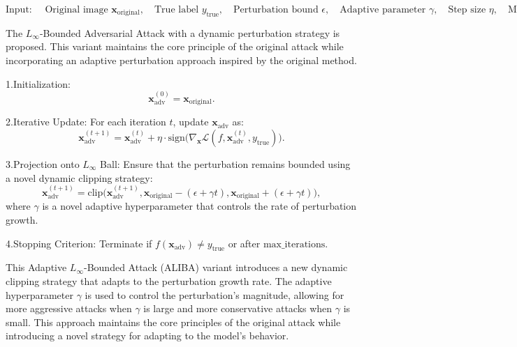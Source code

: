 \[
\text{Input: } \quad \text{Original image } \mathbf{x}_{\text{original}}, \quad \text{True label } y_{\text{true}}, \quad \text{Perturbation bound } \epsilon, \quad \text{Adaptive parameter } \gamma, \quad \text{Step size } \eta, \quad \text{Maximum iterations}.
\]

The $L_\infty$-Bounded Adversarial Attack with a dynamic perturbation strategy is proposed. This variant maintains the core principle of the original attack while incorporating an adaptive perturbation approach inspired by the original method.

1.Initialization:
   \[
   \mathbf{x}_{\text{adv}}^{(0)} = \mathbf{x}_{\text{original}}.
   \]

2.Iterative Update:
   For each iteration $t$, update $\mathbf{x}_{\text{adv}}$ as:
   \[
   \mathbf{x}_{\text{adv}}^{(t+1)} = \mathbf{x}_{\text{adv}}^{(t)} + \eta \cdot \text{sign} \big( \nabla_{\mathbf{x}} \mathcal{L}(f, \mathbf{x}_{\text{adv}}^{(t)}, y_{\text{true}}) \big).
   \]

3.Projection onto $L_\infty$ Ball:
   Ensure that the perturbation remains bounded using a novel dynamic clipping strategy:
   \[
   \mathbf{x}_{\text{adv}}^{(t+1)} = \text{clip}\big(\mathbf{x}_{\text{adv}}^{(t+1)}, \mathbf{x}_{\text{original}} - (\epsilon + \gamma t), \mathbf{x}_{\text{original}} + (\epsilon + \gamma t) \big),
   \]
   where $\gamma$ is a novel adaptive hyperparameter that controls the rate of perturbation growth.

4.Stopping Criterion:
   Terminate if $f(\mathbf{x}_{\text{adv}}) \neq y_{\text{true}}$ or after $\text{max\_iterations}$.

This Adaptive $L_\infty$-Bounded Attack (ALIBA) variant introduces a new dynamic clipping strategy that adapts to the perturbation growth rate. The adaptive hyperparameter $\gamma$ is used to control the perturbation's magnitude, allowing for more aggressive attacks when $\gamma$ is large and more conservative attacks when $\gamma$ is small. This approach maintains the core principles of the original attack while introducing a novel strategy for adapting to the model's behavior.